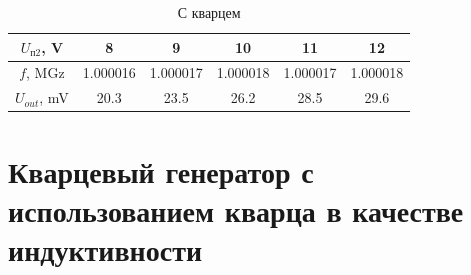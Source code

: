 \documentclass[a4paper]{article}
\begin{document}
\begin{enumerate}
    \begin{table}[H]
        \centering
        \begin{center}
        \end{center}
        \vspace{0.1cm}
        \begin{tabular}{|c|c|c|c|c|c|}
            \hline
            $U_{п2}$, V & 8&9&10&11&12 \\ 
            \hline
            $f$, MGz  &1.000016&  1.000017& 1.000018& 1.000017& 1.000018 \\ 
            \hline
            $U_{out}$, mV &20.3&23.5&26.2 &28.5&29.6 \\
            \hline
            \end{tabular}
            \caption{С кварцем}
            \label{t4}
    \end{table}

\end{enumerate}



\section{Кварцевый генератор с использованием кварца в качестве индуктивности}
\end{document}
